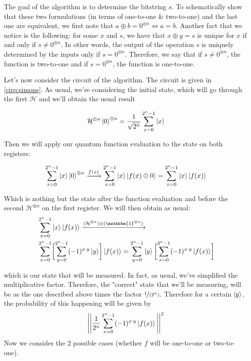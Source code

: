 The goal of the algorithm is to determine the bitstring $s$. To schematically show that these two formulations (in terms of one-to-one \& two-to-one) 
and the last one are equivalent, we first note that $a \oplus b = 0^{\otimes n} \iff a=b$.
Another fact that we notice is the following: for some $x$ and $s$, we have that $x\oplus y = s$ is unique for $x$ if and only if $s \neq 0^{\otimes n}$. 
In other words, the output of the operation $s$ is uniquely determined by the inputs only if $s=0^{\otimes n}$. Therefore, 
we say that if $s\neq 0^{\otimes n}$, the function is two-to-one and if $s=0^{\otimes n}$, the function is one-to-one.

Let's now consider the circuit of the algorithm. The circuit is given in \autoref{cirq:simons}.
As usual, we're considering the initial state, which will go through the first $\mathcal{H}$ and we'll obtain the 
usual result 

\begin{align}
  \mathcal{H}^{\otimes n} \ket{0}^{\otimes n}=\frac{1}{\sqrt{2^n}}\sum_{x=0}^{2^n-1} \ket{x}
\end{align}

Then we will apply our quantum function evaluation to the state on both registers:

\begin{align}
  \sum_{x=0}^{2^n-1} \ket{x} \ket{0}^{\otimes n} \xrightarrow{f(x)} \sum_{x=0}^{2^n-1} \ket{x}\ket{f(x)\oplus 0} =\sum_{x=0}^{2^n-1} \ket{x}\ket{f(x)} 
\end{align}

Which is nothing but the state after the function evaluation and before the second $\mathcal{H}^{\otimes n}$ on the first register. 
We will then obtain as usual:
\begin{align}
  &\sum_{x=0}^{2^n-1} \ket{x}\ket{f(x)} \xrightarrow{(\mathcal{H}^{\otimes n})\otimes (\mathbbm{1}^{\otimes n}) } \\ 
  &\sum_{x=0}^{2^n-1} \biggl[ \sum_{y=0}^{2^n-1} (-1)^{x\cdot y}\ket{y} \biggr] \ket{f(x)}=\sum_{y=0}^{2^n-1}\ket{y} \biggl[ \sum_{x=0}^{2^n-1}(-1)^{x\cdot y}\ket{f(x)} \biggr]
\end{align}

which is our state that will be measured. In fact, as usual, we've simplified the multiplicative factor. Therefore, the "correct" state that we'll be 
measuring, will be as the one described above times the factor $\nicefrac{1}{(2^n)}$. Therefore for a certain $\ket{y}$, the probability of this 
happening will be given by 
\begin{align}
  \Bigg| \Bigg| \frac{1}{2^n} \sum_{x=0}^{2^n-1} (-1)^{x\cdot y} \ket{f(x)} \Bigg| \Bigg|^2
  \label{eq:simons_last_meas}
\end{align}
Now we consider the 2 possible cases (whether $f$ will be one-to-one or two-to-one). 

